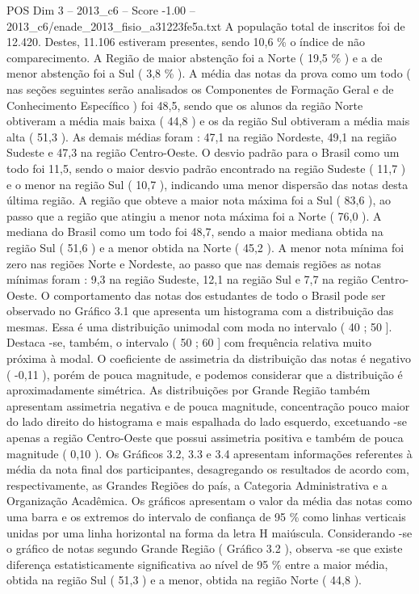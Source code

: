 \begin{textsample}{POS Dim 3 – 2013\_c6 – Score -1.00 – 2013\_c6/enade\_2013\_fisio\_a31223fe5a.txt}
A população total de inscritos foi de 12.420.
Destes, 11.106 estiveram presentes, sendo 10,6 \% o índice de não comparecimento.
A Região de maior abstenção foi a Norte ( 19,5 \% ) e a de menor abstenção foi a Sul ( 3,8 \% ).
A média das notas da prova como um todo ( nas seções seguintes serão analisados os Componentes de Formação Geral e de Conhecimento Específico ) foi 48,5, sendo que os alunos da região Norte obtiveram a média mais baixa ( 44,8 ) e os da região Sul obtiveram a média mais alta ( 51,3 ).
As demais médias foram : 47,1 na região Nordeste, 49,1 na região Sudeste e 47,3 na região Centro-Oeste.
O desvio padrão para o Brasil como um todo foi 11,5, sendo o maior desvio padrão encontrado na região Sudeste ( 11,7 ) e o menor na região Sul ( 10,7 ), indicando uma menor dispersão das notas desta última região.
A região que obteve a maior nota máxima foi a Sul ( 83,6 ), ao passo que a região que atingiu a menor nota máxima foi a Norte ( 76,0 ).
A mediana do Brasil como um todo foi 48,7, sendo a maior mediana obtida na região Sul ( 51,6 ) e a menor obtida na Norte ( 45,2 ).
A menor nota mínima foi zero nas regiões Norte e Nordeste, ao passo que nas demais regiões as notas mínimas foram : 9,3 na região Sudeste, 12,1 na região Sul e 7,7 na região Centro-Oeste.
O comportamento das notas dos estudantes de todo o Brasil pode ser observado no Gráfico 3.1 que apresenta um histograma com a distribuição das mesmas.
Essa é uma distribuição unimodal com moda no intervalo ( 40 ; 50 ].
Destaca -se, também, o intervalo ( 50 ; 60 ] com frequência relativa muito próxima à modal.
O coeficiente de assimetria da distribuição das notas é negativo ( -0,11 ), porém de pouca magnitude, e podemos considerar que a distribuição é aproximadamente simétrica.
As distribuições por Grande Região também apresentam assimetria negativa e de pouca magnitude, concentração pouco maior do lado direito do histograma e mais espalhada do lado esquerdo, excetuando -se apenas a região Centro-Oeste que possui assimetria positiva e também de pouca magnitude ( 0,10 ).
Os Gráficos 3.2, 3.3 e 3.4 apresentam informações referentes à média da nota final dos participantes, desagregando os resultados de acordo com, respectivamente, as Grandes Regiões do país, a Categoria Administrativa e a Organização Acadêmica.
Os gráficos apresentam o valor da média das notas como uma barra e os extremos do intervalo de confiança de 95 \% como linhas verticais unidas por uma linha horizontal na forma da letra H maiúscula.
Considerando -se o gráfico de notas segundo Grande Região ( Gráfico 3.2 ), observa -se que existe diferença estatisticamente significativa ao nível de 95 \% entre a maior média, obtida na região Sul ( 51,3 ) e a menor, obtida na região Norte ( 44,8 ).

\end{textsample}
